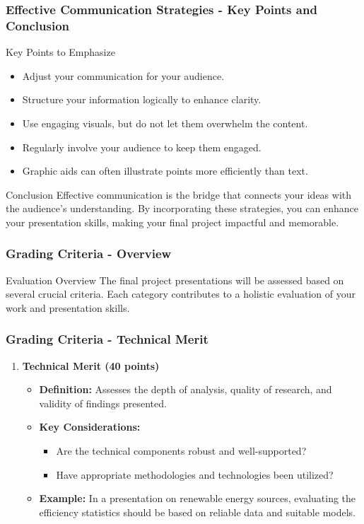 \documentclass[aspectratio=169]{beamer}
\begin{document}
\begin{frame}[fragile]
    \frametitle{Effective Communication Strategies - Key Points and Conclusion}
    \begin{block}{Key Points to Emphasize}
        \begin{itemize}
            \item Adjust your communication for your audience.
            \item Structure your information logically to enhance clarity.
            \item Use engaging visuals, but do not let them overwhelm the content.
            \item Regularly involve your audience to keep them engaged.
            \item Graphic aids can often illustrate points more efficiently than text.
        \end{itemize}
    \end{block}

    \begin{block}{Conclusion}
        Effective communication is the bridge that connects your ideas with the audience’s understanding. By incorporating these strategies, you can enhance your presentation skills, making your final project impactful and memorable.
    \end{block}
\end{frame}

\begin{frame}[fragile]
    \frametitle{Grading Criteria - Overview}
    \begin{block}{Evaluation Overview}
        The final project presentations will be assessed based on several crucial criteria. Each category contributes to a holistic evaluation of your work and presentation skills.
    \end{block}
\end{frame}

\begin{frame}[fragile]
    \frametitle{Grading Criteria - Technical Merit}
    \begin{enumerate}
        \item \textbf{Technical Merit (40 points)}
        \begin{itemize}
            \item \textbf{Definition:} Assesses the depth of analysis, quality of research, and validity of findings presented.
            \item \textbf{Key Considerations:}
            \begin{itemize}
                \item Are the technical components robust and well-supported?
                \item Have appropriate methodologies and technologies been utilized?
            \end{itemize}
            \item \textbf{Example:} In a presentation on renewable energy sources, evaluating the efficiency statistics should be based on reliable data and suitable models.
        \end{itemize}
    \end{enumerate}
\end{frame}
\end{document}
